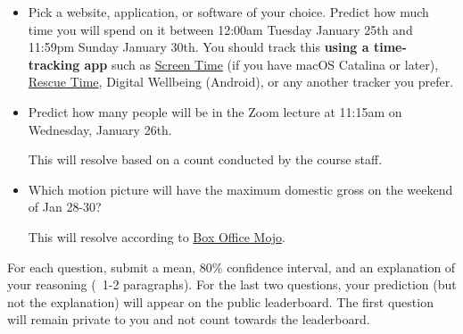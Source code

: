\documentclass[11pt]{article}
\begin{document}
\begin{itemize}
\item Pick a website, application, or software of your choice. Predict how much time you will spend on it between 12:00am Tuesday January 25th and 11:59pm Sunday January 30th. You should track this {\bf using a time-tracking app} such as \href{https://support.apple.com/en-us/HT210387}{Screen Time} (if you have macOS Catalina or later), \href{https://www.rescuetime.com/}{Rescue Time}, Digital Wellbeing (Android), or any another tracker you prefer.

\item Predict how many people will be in the Zoom lecture at 11:15am on Wednesday, January 26th.

      This will resolve based on a count conducted by the course staff.

\item Which motion picture will have the maximum domestic gross on the weekend of Jan 28-30?

      This will resolve according to \href{https://www.boxofficemojo.com/weekend/?ref_=bo_nb_wey_secondarytab}{Box Office Mojo}.

\end{itemize}

For each question, submit a mean, 80\% confidence interval, and an explanation of your reasoning (~1-2 paragraphs).
For the last two questions, your prediction (but not the explanation) will appear on the public leaderboard. 
The first question will remain private to you and not count towards the leaderboard.
\end{document}
